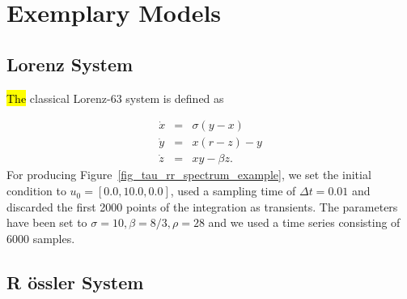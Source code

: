 \documentclass[entropy,article,accept,pdftex,moreauthors]{Definitions/mdpi}
\begin{document}

\vspace{-6pt}

\appendixstart
\appendix

\section{Exemplary Models}
 
\subsection{Lorenz System}\label{sec_models_lorenz63}

\hl{The} classical Lorenz-63 system \cite{lorenz1963} is defined as

\begin{equation}
\begin{array}{rcl}
\dot{x}&=&\sigma(y-x) \\
\dot{y}&=&x(r-z)-y \\
\dot{z}&=&xy - \beta z.
\end{array}
\label{eq_model_Lorenz63}
\end{equation}
{For} producing Figure~\ref{fig_tau_rr_spectrum_example}, we set the initial condition to $u_0=[0.0, 10.0, 0.0]$, used a sampling time of $\Delta t=0.01$ and discarded the first 
2000 points of the integration as transients. The parameters have been set to 
$\sigma=10, \beta=8/3, \rho=28$ and we used a time series consisting of 6000 samples.

\subsection{R \"ossler System}\label{sec_models_roessler}
\end{document}
